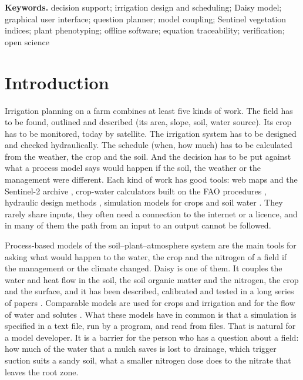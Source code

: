 \begin{titlepage}
{\medskip\noindent \textbf{Keywords.} decision support; irrigation design and scheduling; Daisy model; graphical user interface; question planner; model coupling; Sentinel vegetation indices; plant phenotyping; offline software; equation traceability; verification; open science\par}
\end{titlepage}

\section{Introduction}
Irrigation planning on a farm combines at least five kinds of work. The field has to be found, outlined and described (its area, slope, soil, water source). Its crop has to be monitored, today by satellite. The irrigation system has to be designed and checked hydraulically. The schedule (when, how much) has to be calculated from the weather, the crop and the soil. And the decision has to be put against what a process model says would happen if the soil, the weather or the management were different. Each kind of work has good tools: web maps and the Sentinel-2 archive \citep{Drusch2012}, crop-water calculators built on the FAO procedures \citep{Allen1998,Doorenbos1979}, hydraulic design methods \citep{Keller1990,Walker1989}, simulation models for crops and soil water \citep{Jones2003,Keating2003,Steduto2009,Simunek2008,Hansen2012}. They rarely share inputs, they often need a connection to the internet or a licence, and in many of them the path from an input to an output cannot be followed.

Process-based models of the soil--plant--atmosphere system are the main tools for asking what would happen to the water, the crop and the nitrogen of a field if the management or the climate changed. Daisy is one of them. It couples the water and heat flow in the soil, the soil organic matter and the nitrogen, the crop and the surface, and it has been described, calibrated and tested in a long series of papers \citep{Hansen1990,Abrahamsen2000,Hansen2012,Holbak2026}. Comparable models are used for crops and irrigation \citep{Jones2003,Keating2003,Steduto2009} and for the flow of water and solutes \citep{Simunek2008,Simunek2016}. What these models have in common is that a simulation is specified in a text file, run by a program, and read from files. That is natural for a model developer. It is a barrier for the person who has a question about a field: how much of the water that a mulch saves is lost to drainage, which trigger suction suits a sandy soil, what a smaller nitrogen dose does to the nitrate that leaves the root zone.


